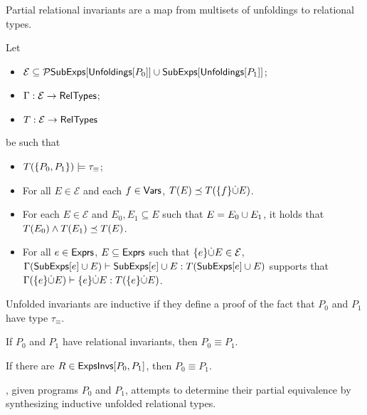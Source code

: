 Partial relational invariants are a map from multisets of unfoldings
to relational types.
%
\begin{defn}
  \label{defn:inferred-invs}
  Let
  \begin{itemize}
  \item 
    $\mathcal{E} \subseteq \mathcal{P}{ \mathsf{SubExps}[  \mathsf{Unfoldings}[ P_0 ]  ] \cup
      \mathsf{SubExps}[ \mathsf{Unfoldings}[ P_1 ]  ] }$;
  \item
    $\Gamma : \mathcal{E} \to \mathsf{RelTypes}$;
  \item
    $T : \mathcal{E} \to \mathsf{RelTypes}$
  \end{itemize}
  be such that 
  \begin{itemize}
  \item 
    $T( \{  P_0, P_1  \} ) \models \tau_{ \equiv }$; 
  \item 
    For all $E \in \mathcal{E}$ and each $f \in \mathsf{Vars}$, $T(E) \preceq
    T(\{  f  \} \dot{\cup}  E)$.
  \item 
    For each $E \in \mathcal{E}$ and $E_0, E_1 \subseteq E$ such that
    $E = E_0 \cup E_1$, it holds that $T(E_0) \land T(E_1) \preceq
    T(E)$.
  \item 
    For all $e \in \mathsf{Exprs}$, $E \subseteq \mathsf{Exprs}$ such that
    $\{ e \} \dot{\cup} E \in \mathcal{E}$, $\Gamma(\mathsf{SubExps}[ e ] \cup E)
    \vdash \mathsf{SubExps}[  e  ] \cup E : T( \mathsf{SubExps}[ e ] \cup E)$
    supports that $\Gamma(\{ e \} \dot{\cup} E) \vdash \{ e \} \dot{\cup} E :
    T(\{ e \} \dot{\cup} E)$.
  \end{itemize}
\end{defn}
%
%

Unfolded invariants are inductive if they define a proof of the fact
that $P_0$ and $P_1$ have type $\tau_{\equiv}$.
% 
\begin{defn}
  \label{defn:ind-unfolded}
\end{defn}

If $P_0$ and $P_1$ have relational invariants, then $P_0 \equiv P_1$.
%
\begin{lemma}
  \label{lemma:equiv-evidence}
  If there are $R \in \mathsf{ExpsInvs}[ P_0, P_1 ]$, then $P_0 \equiv P_1$.
\end{lemma}
%
\sys, given programs $P_0$ and $P_1$, attempts to determine their
partial equivalence by synthesizing inductive unfolded relational
types.


